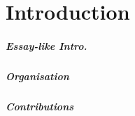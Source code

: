 \chapter{Introduction}\label{\positionnumber}  
\paragraph{Essay-like Intro.}

\paragraph{Organisation} 

\paragraph{Contributions}
